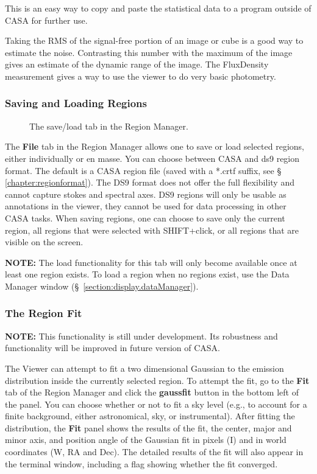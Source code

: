 This is an easy way to copy and paste the statistical data to a program outside of CASA for
further use. 

Taking the RMS of the signal-free portion of an image or cube is a good way
to estimate the noise. Contrasting this number with the maximum of the image gives an estimate 
of the dynamic range of the image. The FluxDensity measurement gives
a way to use the viewer to do very basic photometry.

\subsubsection{Saving and Loading Regions}
\label{section:display.viewerGUI.displaypanel.region.saveload}

\begin{figure}[h!]
\begin{center}
\caption{\label{fig:viewer_regionsave} The save/load tab in the Region Manager.}
\hrulefill
\end{center}
\end{figure}

The {\bf File} tab in the Region Manager allows one to save or load selected
regions, either individually or en masse. You can choose between CASA and 
ds9 region format. The
default is a CASA region file (saved with a *.crtf suffix, see
\S\,\ref{chapter:regionformat}). The DS9 format does not offer the full
flexibility and cannot capture stokes and spectral axes. DS9 regions
will only be usable as annotations in the viewer, they cannot be used
for data processing in other CASA tasks. When saving regions, one can choose
to save only the current region, all regions that were selected with
SHIFT+click, or all regions that are visible on the screen. 

{\bf NOTE:} The load functionality for this tab will only become available once at
least one region exists. To load a region when no regions exist, use the Data Manager
window (\S~\ref{section:display.dataManager}).

\subsubsection{The Region Fit}
\label{section:display.viewerGUI.displaypanel.region.fit}

{\bf NOTE:} This functionality is still under development. Its robustness and functionality will
be improved in future version of CASA.

The Viewer can attempt to fit a two dimensional Gaussian to the emission distribution inside the 
currently selected region. To attempt the fit, go to the {\bf Fit} tab of the Region Manager and click the
{\bf gaussfit} button in the bottom left of the panel. You can choose whether or not
to fit a sky level (e.g., to account for a finite background, either astronomical, sky, or instrumental).
After fitting the distribution, the {\bf Fit} panel shows the results of the fit, the center, major and minor axis,
and position angle of the Gaussian fit in pixels (I) and in world coordinates (W, RA and Dec). The 
detailed results of the fit will also appear in the terminal window, including a flag showing whether the
fit converged.

